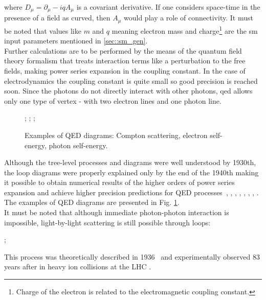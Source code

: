 where $D_{\mu} = \partial_{\mu}-iqA_{\mu}$ is a covariant derivative. If one considers space-time in the presence of a field as curved, then $A_{\mu}$ would play a role of connectivity. It must be noted that values like $m$ and $q$ meaning electron mass and charge\footnote{Charge of the electron is related to the electromagnetic coupling constant.} are the \gls{sm} input parameters mentioned in \ref{sec::sm_gen}.  \\
Further calculations are to be performed by the means of the quantum field theory formalism that treats interaction terms like a perturbation to the free fields, making power series expansion in the coupling constant. In the case of electrodynamics the coupling constant is quite small so good precision is reached soon. Since the photons do not directly interact with other photons, \gls{qed} allows only one type of vertex - with two electron lines and one photon line. \\
\begin{figure}
\label{fig::qed}
\centering
{};
;
;
\caption{Examples of QED diagrams: Compton scattering, electron self-energy, photon self-energy.}
\end{figure}
Although the tree-level processes and diagrams were well understood by 1930th, the loop diagrams were properly explained only by the end of the 1940th making it possible to obtain numerical results of the higher orders of power series expansion and achieve higher precision predictions for QED processes~\cite{Schwinger_covar}, \cite{Schwinger_polariz}, \cite{Feynman_math}, \cite{Feynman_positrons}, \cite{Feynman_spacetime}, \cite{Tomonaga}, \cite{Dyson_all}, \cite{Dyson_smatr}. The examples of QED diagrams are presented in Fig. \ref{fig::qed}.\\
It must be noted that although immediate photon-photon interaction is impossible, light-by-light scattering is still possible through loops:\\

\begin{center}
;\\
\end{center}
This process was theoretically described in 1936~\cite{lbl_th} and experimentally observed 83 years after in heavy ion collisions at the LHC \cite{lbl_exp}.

